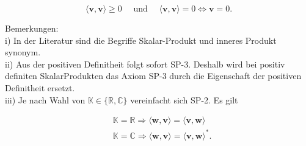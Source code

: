 \documentclass[10pt]{article}
\begin{document}
\begin{equation*}
\langle\mathbf{v}, \mathbf{v}\rangle \geq 0 \quad \text { und } \quad\langle\mathbf{v}, \mathbf{v}\rangle=0 \Leftrightarrow \mathbf{v}=0 . \tag{7.52}
\end{equation*}


Bemerkungen:\\
i) In der Literatur sind die Begriffe Skalar-Produkt und inneres Produkt synonym.\\
ii) Aus der positiven Definitheit folgt sofort SP-3. Deshalb wird bei positiv definiten SkalarProdukten das Axiom SP-3 durch die Eigenschaft der positiven Definitheit ersetzt.\\
iii) Je nach Wahl von $\mathbb{K} \in\{\mathbb{R}, \mathbb{C}\}$ vereinfacht sich SP-2. Es gilt


\begin{align*}
& \mathbb{K}=\mathbb{R} \Rightarrow\langle\mathbf{w}, \mathbf{v}\rangle=\langle\mathbf{v}, \mathbf{w}\rangle  \tag{7.53}\\
& \mathbb{K}=\mathbb{C} \Rightarrow\langle\mathbf{w}, \mathbf{v}\rangle=\langle\mathbf{v}, \mathbf{w}\rangle^{*} . \tag{7.54}
\end{align*}
\end{document}

